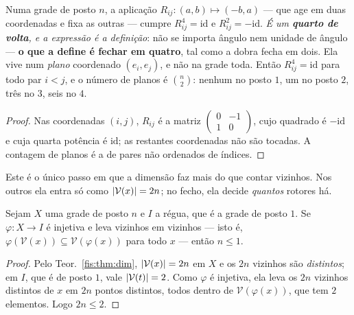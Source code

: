 \documentclass[livro.tex]{subfiles}
\begin{document}
\begin{teorema}\label{fis:thm:fecho}
Numa grade de posto $n$, a aplicação $R_{ij}\colon(a,b)\mapsto(-b,a)$ --- que
age em duas coordenadas e fixa as outras --- cumpre $R_{ij}^{4}=\mathrm{id}$ e
$R_{ij}^{2}=-\mathrm{id}$. \emph{É um \textbf{quarto de volta}, e a expressão é a
definição}: não se importa ângulo nem unidade de ângulo --- \textbf{o que a
define é fechar em quatro}, tal como a dobra fecha em dois. Ela vive num
\emph{plano} coordenado $(e_i,e_j)$, e não na grade toda.
Então $R_{ij}^{4}=\mathrm{id}$ para todo par $i<j$, e o número de planos é
$\binom{n}{2}$: nenhum no posto $1$, um no posto $2$, três no $3$, seis no $4$.
\end{teorema}

\begin{proof}
Nas coordenadas $(i,j)$, $R_{ij}$ é a matriz
$\left(\begin{smallmatrix}0&-1\\1&0\end{smallmatrix}\right)$, cujo quadrado é
$-\mathrm{id}$ e cuja quarta potência é $\mathrm{id}$; as restantes coordenadas
não são tocadas. A contagem de planos é a de pares não ordenados de índices.
\end{proof}

\medskip\noindent Este é o único passo em que a dimensão faz mais do que contar
vizinhos. Nos outros ela entra só como $\lvert \mathcal{V}(x)\rvert=2n$; no fecho, ela
decide \emph{quantos} rotores há.

\begin{teorema}\label{fis:thm:vizniso}
Sejam $X$ uma grade de posto $n$ e $I$ a régua, que é a grade de posto $1$. Se
$\varphi\colon X\to I$ é injetiva e leva vizinhos em vizinhos --- isto é,
$\varphi(\mathcal{V}(x))\subseteq\mathcal{V}(\varphi(x))$ para todo $x$ --- então
$n\le1$.
\end{teorema}

\begin{proof}
Pelo Teor.~\ref{fis:thm:dim}, $\lvert \mathcal{V}(x)\rvert=2n$ em $X$ e os $2n$ vizinhos
são \emph{distintos}; em $I$, que é de posto $1$, vale
$\lvert \mathcal{V}(t)\rvert=2$. Como $\varphi$ é injetiva, ela leva os $2n$ vizinhos
distintos de $x$ em $2n$ pontos distintos, todos dentro de
$\mathcal{V}(\varphi(x))$, que tem $2$ elementos. Logo $2n\le2$.
\end{proof}
\end{document}

